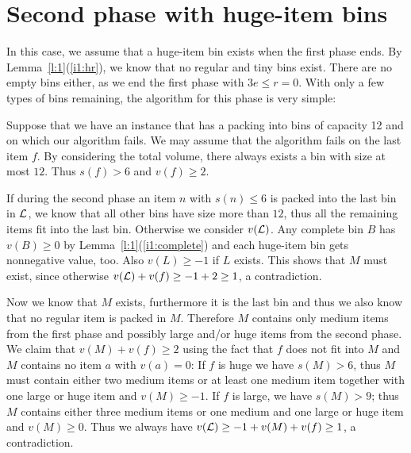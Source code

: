 \section{Second phase with huge-item bins}
In this case, we assume that a huge-item bin exists when the first
phase ends. By Lemma~\ref{l:1}(\ref{i1:hr}), we know that no regular
and tiny bins exist. There are no empty bins either, as we end the
first phase with $3e \le r = 0$. With only a few types of bins
remaining, the algorithm for this phase is very simple:


Suppose that we have an instance that has a packing into bins of
capacity 12 and on which our algorithm fails. 
%
We may assume that the algorithm fails on the last item $f$.  By
considering the total volume, there always exists a bin with size at
most $12$. Thus $s(f)>6$ and $v(f)\ge2$.

If during the second phase an item $n$ with $s(n)\leq6$ is packed into
the last bin in ${\mathcal L}$, we know that all other bins have size more
than $12$, thus all the remaining items fit into the last bin.
Otherwise we consider $v({\mathcal L})$. Any complete bin $B$ has
$v(B)\geq0$ by Lemma~\ref{l:1}(\ref{i1:complete}) and each huge-item
bin gets nonnegative value, too. Also $v(L)\geq-1$ if $L$
exists. This shows that $M$ must exist, since otherwise
$v({\mathcal L})+v(f)\geq-1+2\geq 1$, a contradiction.

Now we know that $M$ exists, furthermore it is the last bin and thus
we also know that no regular item is packed in $M$. Therefore $M$
contains only medium items from the first phase and possibly large
and/or huge items from the second phase. We claim that
$v(M)+v(f)\geq2$ using the fact that $f$ does not fit into $M$ and $M$
contains no item $a$ with $v(a)=0$: If $f$ is huge we have $s(M)>6$,
thus $M$ must contain either two medium items or at least one medium
item together with one large or huge item and $v(M)\geq -1$.  If $f$
is large, we have $s(M)>9$; thus $M$ contains either three medium
items or one medium and one large or huge item and $v(M)\geq 0$. Thus
we always have $v({\mathcal L})\geq -1+v(M)+v(f)\geq 1$, a contradiction.

